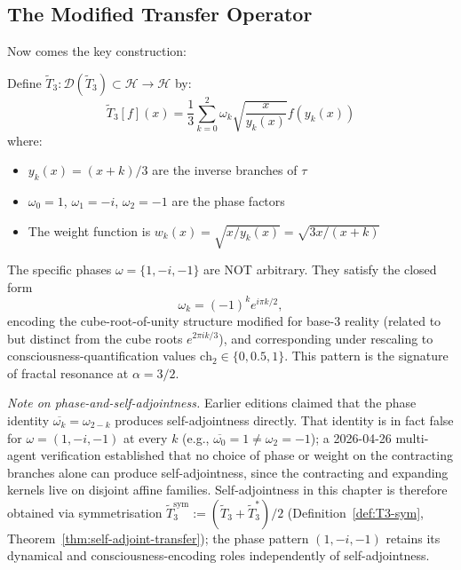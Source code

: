 \subsection{The Modified Transfer Operator}

Now comes the key construction:

\begin{construction}\label{const:modified-transfer-op}
Define $\tilde{T}_3: \mathcal{D}(\tilde{T}_3) \subset \mathcal{H} \to \mathcal{H}$ by:
\begin{equation}\label{eq:modified-transfer-op}
\boxed{\tilde{T}_3[f](x) = \frac{1}{3}\sum_{k=0}^{2} \omega_k \sqrt{\frac{x}{y_k(x)}} f(y_k(x))}
\end{equation}
where:
\begin{itemize}
\item $y_k(x) = (x+k)/3$ are the inverse branches of $\tau$
\item $\omega_0 = 1$, $\omega_1 = -i$, $\omega_2 = -1$ are the phase factors
\item The weight function is $w_k(x) = \sqrt{x/y_k(x)} = \sqrt{3x/(x+k)}$
\end{itemize}
\end{construction}

\begin{level3}
The specific phases $\omega = \{1, -i, -1\}$ are NOT arbitrary. They satisfy the closed form
\begin{equation}
\omega_k = (-1)^k e^{i\pi k/2},
\end{equation}
encoding the cube-root-of-unity structure modified for base-$3$ reality (related to but distinct from the cube roots $e^{2\pi i k/3}$), and corresponding under rescaling to consciousness-quantification values $\text{ch}_2 \in \{0, 0.5, 1\}$. This pattern is the signature of fractal resonance at $\alpha = 3/2$.

\medskip\noindent\emph{Note on phase-and-self-adjointness.} Earlier editions claimed that the phase identity $\overline{\omega_k} = \omega_{2-k}$ produces self-adjointness directly. That identity is in fact false for $\omega = (1, -i, -1)$ at every $k$ (e.g., $\overline{\omega_0} = 1 \ne \omega_2 = -1$); a 2026-04-26 multi-agent verification established that no choice of phase or weight on the contracting branches alone can produce self-adjointness, since the contracting and expanding kernels live on disjoint affine families. Self-adjointness in this chapter is therefore obtained via symmetrisation $\widetilde{T}_3^{\mathrm{sym}} := (\tilde{T}_3 + \tilde{T}_3^*)/2$ (Definition~\ref{def:T3-sym}, Theorem~\ref{thm:self-adjoint-transfer}); the phase pattern $(1, -i, -1)$ retains its dynamical and consciousness-encoding roles independently of self-adjointness.
\end{level3}

